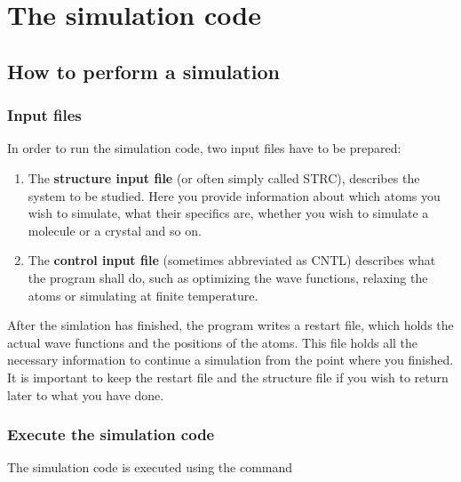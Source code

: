 \documentclass[final,12pt]{article}
\begin{document}
\section{The simulation code}

\subsection{How to perform a simulation}

\subsubsection{Input files}

In order to run the simulation code, two input files have to be
prepared:

\begin{enumerate}
\item The \textbf{structure input file} (or often simply called STRC),
  describes the system to be studied. Here you provide information
  about which atoms you wish to simulate, what their specifics are,
  whether you wish to simulate a molecule or a crystal and so on.
\item The \textbf{control input file} (sometimes abbreviated as CNTL)
  describes what the program shall do, such as optimizing the wave
  functions, relaxing the atoms or simulating at finite temperature.
\end{enumerate}

After the simlation has finished, the program writes a restart file, which
holds the actual wave functions and the positions of the atoms. This
file holds all the necessary information to continue a simulation from
the point where you finished.  It is important to keep the restart file
and the structure file if you wish to return later to what you have
done. 

\subsubsection{Execute the simulation code}

The simulation code is executed using the command

\bigskip{}\bigskip
\end{document}
